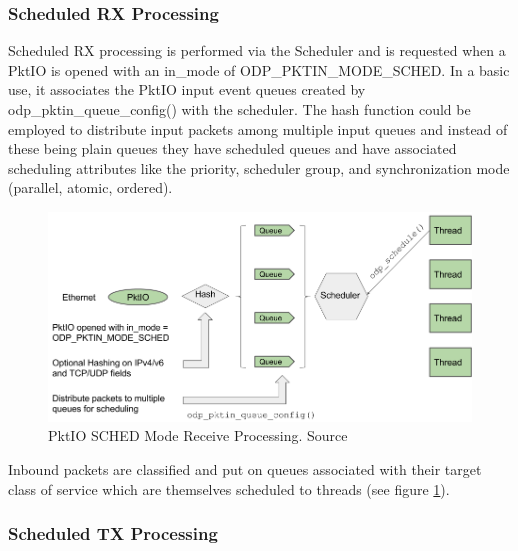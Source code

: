 \subsubsection{Scheduled RX Processing}
Scheduled RX processing is performed via the Scheduler and is requested when a PktIO is opened with an in\_mode of ODP\_PKTIN\_MODE\_SCHED.
In a basic use, it associates the PktIO input event queues created by odp\_pktin\_queue\_config() with the scheduler. The hash function could be employed to distribute input packets among multiple input queues and instead of these being plain queues they have scheduled queues and have associated scheduling attributes like the priority, scheduler group, and synchronization mode (parallel, atomic, ordered). 



 \begin{figure}[ht]
 	\centering
 	\includegraphics[width=0.55\linewidth] 
     {figures/pktin_sched_recv.png}
  	\caption{PktIO SCHED Mode Receive Processing.  Source} 
 	\label{fig:pktin_sched}
 \end{figure}

Inbound packets are classified and put on queues associated with their target class of service which are themselves scheduled to threads (see figure \ref{fig:pktin_sched}). 

\subsubsection{Scheduled TX Processing}

